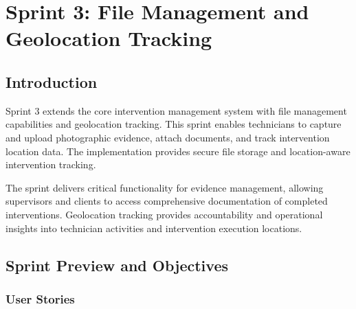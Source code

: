 
\chapter{Sprint 3: File Management and Geolocation Tracking}

\section{Introduction}

Sprint 3 extends the core intervention management system with file management capabilities and geolocation tracking. This sprint enables technicians to capture and upload photographic evidence, attach documents, and track intervention location data. The implementation provides secure file storage and location-aware intervention tracking.

The sprint delivers critical functionality for evidence management, allowing supervisors and clients to access comprehensive documentation of completed interventions. Geolocation tracking provides accountability and operational insights into technician activities and intervention execution locations.

\section{Sprint Preview and Objectives}

\subsection{User Stories}


